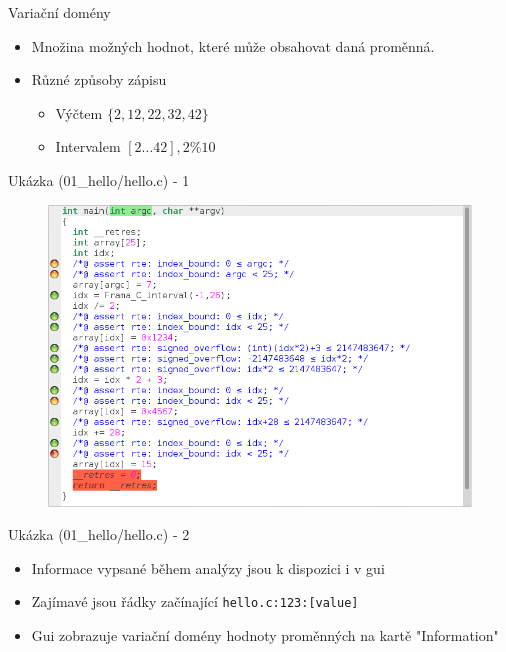 \documentclass[11pt]{beamer}
\begin{document}
\begin{frame}{Variační domény}
	\begin{itemize}
			\item Množina možných hodnot, které může obsahovat daná proměnná.
			\item Různé způsoby zápisu
			\begin{itemize}
				\item Výčtem \( \{ 2, 12, 22, 32, 42 \} \)
				\item Intervalem \( [2 \ldots 42], 2 \% 10 \)
			\end{itemize}
	\end{itemize}
\end{frame}

\begin{frame}{Ukázka (01\_hello/hello.c) - 1}
	\begin{figure}
		\includegraphics[scale=0.3]{./img/value_01.png}
	\end{figure}
\end{frame}



\begin{frame}{Ukázka (01\_hello/hello.c) - 2}
	\lstFirstValueAnalysis
	\begin{itemize}
			\item Informace vypsané během analýzy jsou k dispozici i v gui
			\item Zajímavé jsou řádky začínající \texttt{hello.c:123:[value]}
			\item Gui zobrazuje variační domény hodnoty proměnných na kartě "Information"
	\end{itemize}
\end{frame}
\end{document}
